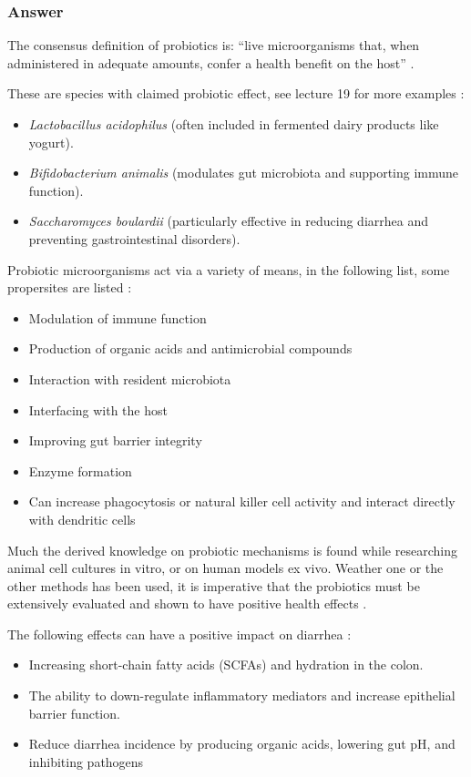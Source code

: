 \subsubsection*{Answer}
The consensus definition of probiotics is: “live microorganisms that, when administered in adequate amounts, confer a health benefit on the host” \cite*{L10-Pro_Pre}.

These are species with claimed probiotic effect, see lecture 19 for more examples \cite*{LS19}:
\begin{itemize}
    \item \textit{Lactobacillus acidophilus} (often included in fermented dairy products like yogurt).
    \item \textit{Bifidobacterium animalis} (modulates gut microbiota and supporting immune function).
    \item \textit{Saccharomyces boulardii} (particularly effective in reducing diarrhea and preventing gastrointestinal disorders).
\end{itemize}

Probiotic microorganisms act via a variety of means, in the following list, some propersites are listed \cite*{L10-Pro_Pre}:
\begin{itemize}
    \item Modulation of immune function
    \item Production of organic acids and antimicrobial compounds
    \item Interaction with resident microbiota
    \item Interfacing with the host
    \item Improving gut barrier integrity
    \item Enzyme formation
    \item Can increase phagocytosis or natural killer cell activity and interact directly with dendritic cells
\end{itemize}

Much the derived knowledge on probiotic mechanisms is found while researching animal cell cultures in vitro, or on human models ex vivo. Weather one or the other methods has been used, it is imperative that the probiotics must be extensively evaluated and shown to have positive health effects \cite*{L10-Pro_Pre,LS19}.

The following effects can have a positive impact on diarrhea \cite*{L10-Pro_Pre}:
\begin{itemize}
    \item Increasing short-chain fatty acids (SCFAs) and hydration in the colon.
    \item The ability to down-regulate inflammatory mediators and increase epithelial barrier function.
    \item Reduce diarrhea incidence by producing organic acids, lowering gut pH, and inhibiting pathogens
\end{itemize}

